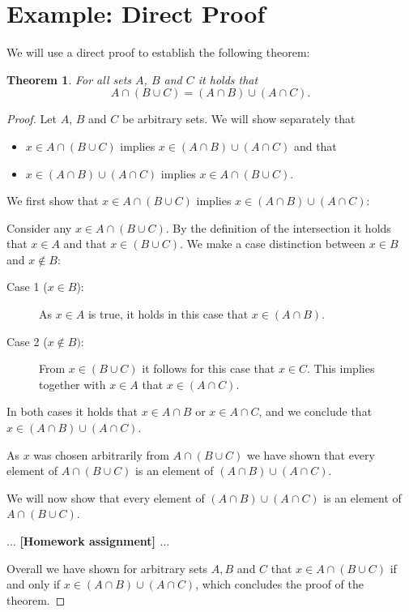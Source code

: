 \documentclass{article}
\newtheorem{theorem}{Theorem}
\begin{document}
\clearpage
\section{Example: Direct Proof}

We will use a direct proof to establish the following theorem:

\begin{theorem}
	For all sets $A$, $B$ and $C$ it holds that
	\[A\cap(B\cup C) = (A\cap B) \cup (A\cap C).\]
\end{theorem}
\bigskip

\begin{proof}
	Let $A$, $B$ and $C$ be arbitrary sets. We will show separately that

	\begin{itemize}
		\item  $x\in A\cap (B\cup C)$ implies $x\in (A\cap B)\cup(A\cap C)$ and
		      that
		\item $x\in (A\cap B) \cup (A\cap C)$ implies $x\in A\cap(B\cup C)$.
	\end{itemize}

	We first show that $x\in A\cap (B\cup C)$ implies $x\in (A\cap B)\cup(A\cap
		C)$:
	\smallskip

	Consider any $x\in A\cap(B\cup C)$. By the definition of the intersection it holds that
	$x\in A$ and that $x\in (B\cup C)$. We make a case distinction between $x\in B$
	and $x\notin B$:
	\begin{description}
		\item [Case 1 ($x\in B$):] As $x\in A$ is true, it holds in this case that
		      $x\in(A\cap B)$.
		\item [Case 2 ($x\notin B)$:] From $x\in (B\cup C)$ it follows for this
		      case that $x\in C$. This implies together with $x\in A$ that $x\in (A\cap C)$.
	\end{description}

	In both cases it holds that $x\in A\cap B$ or $x\in A\cap C$, and we conclude
	that $x\in(A\cap B) \cup (A\cap C)$.
	\smallskip

	As $x$ was chosen arbitrarily from $A\cap(B\cup C)$ we have shown that every
	element of $A\cap (B\cup C)$ is an element of $(A\cap B)\cup (A\cap C)$.
	\bigskip

	We will now show that every element of $(A\cap B) \cup (A\cap C)$ is an element
	of $A\cap (B\cup C)$.
	\bigskip

	$\dots$ \textbf{[Homework assignment] $\dots$}
	\bigskip

	Overall we have shown for arbitrary sets $A,B$ and $C$ that $x \in A\cap(B\cup
		C)$ if and only if $x\in (A\cap B)\cup (A\cap C)$, which concludes the proof of
	the theorem.
\end{proof}
\end{document}
